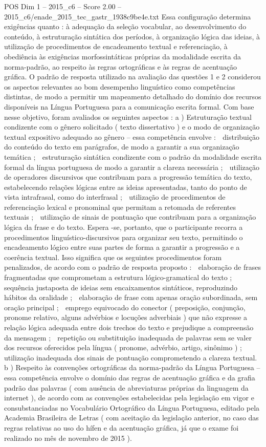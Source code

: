 \begin{textsample}{POS Dim 1 – 2015\_c6 – Score 2.00 – 2015\_c6/enade\_2015\_tec\_gastr\_1938c9be4e.txt}
Essa configuração determina exigências quanto : à adequação da seleção vocabular, ao desenvolvimento do conteúdo, à estruturação sintática dos períodos, à organização lógica das ideias, à utilização de procedimentos de encadeamento textual e referenciação, à obediência às exigências morfossintáticas próprias da modalidade escrita da norma-padrão, ao respeito às regras ortográficas e às regras de acentuação gráfica.
O padrão de resposta utilizado na avaliação das questões 1 e 2 considerou os aspectos relevantes ao bom desempenho linguístico como competências distintas, de modo a permitir um mapeamento detalhado do domínio dos recursos disponíveis na Língua Portuguesa para a comunicação escrita formal.
Com base nesse objetivo, foram avaliados os seguintes aspectos : a ) Estruturação textual condizente com o gênero solicitado ( texto dissertativo ) e o modo de organização textual expositivo adequado ao gênero – essa competência envolve :  distribuição do conteúdo do texto em parágrafos, de modo a garantir a sua organização temática ;  estruturação sintática condizente com o padrão da modalidade escrita formal da língua portuguesa de modo a garantir a clareza necessária ;  utilização de operadores discursivos que contribuam para a progressão temática do texto, estabelecendo relações lógicas entre as ideias apresentadas, tanto do ponto de vista intrafrasal, como do interfrasal ;  utilização de procedimentos de referenciação lexical e pronominal que permitam a retomada de referentes textuais ;  utilização de sinais de pontuação que contribuam para a organização lógica da frase e do texto.
Espera -se, portanto, que o participante recorra a procedimentos linguístico-discursivos para organizar seu texto, permitindo o encadeamento lógico entre suas partes de forma a garantir a progressão e a coerência textual.
Isso significa que os seguintes procedimentos foram penalizados, de acordo com o padrão de resposta proposto :  elaboração de frases fragmentadas que comprometam a estrutura lógico-gramatical do texto ;  sequência justaposta de ideias sem encaixamentos sintáticos, reproduzindo hábitos da oralidade ;  elaboração de frase com apenas oração subordinada, sem oração principal ;  emprego equivocado do conector ( preposição, conjunção, pronome relativo, alguns advérbios e locuções adverbiais ) que não expresse a relação lógica adequada entre dois trechos do texto e prejudique a compreensão da mensagem ;  repetição ou substituição inadequada de palavras sem se valer dos recursos oferecidos pela língua ( pronome, advérbio, artigo, sinônimo ) ;  utilização inadequada dos sinais de pontuação comprometendo a clareza textual. b ) Respeito às convenções ortográficas da norma-padrão da Língua Portuguesa – essa competência envolve o domínio das regras de acentuação gráfica e da grafia padrão das palavras ( com ausência de abreviaturas próprias da linguagem da internet ), de acordo com as convenções estabelecidas pela legislação em vigor e consubstanciadas no Vocabulário Ortográfico da Língua Portuguesa, editado pela Academia Brasileira de Letras ( com aceitação da legislação anterior, no caso das regras relativas ao uso do hífen e da acentuação gráfica, já que o exame foi realizado no mês de novembro de 2015 ).

\end{textsample}
